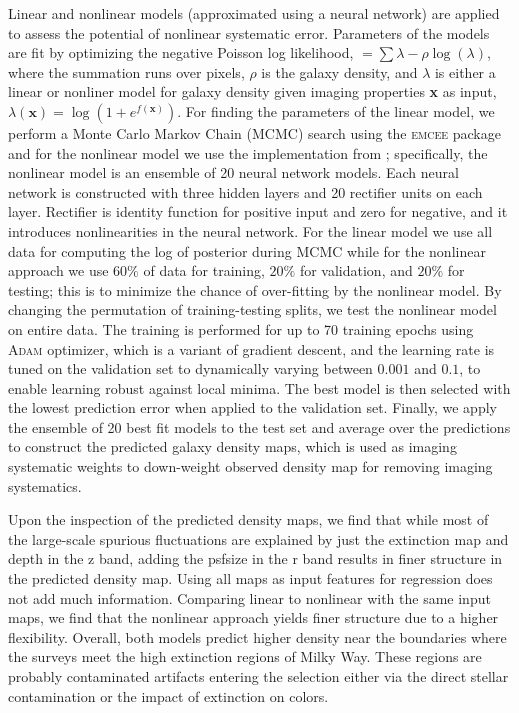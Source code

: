 Linear and nonlinear models (approximated using a neural network) are applied to assess the potential of nonlinear systematic error. Parameters of the models are fit by optimizing the negative Poisson log likelihood, $= \sum \lambda - \rho \log(\lambda)$, where the summation runs over pixels, $\rho$ is the galaxy density, and $\lambda$ is either a linear or nonliner model for galaxy density given imaging properties \textbf{x} as input, $\lambda(\textbf{x}) = \log (1+e^{f(\textbf{x})})$. For finding the parameters of the linear model, we perform a Monte Carlo Markov Chain (MCMC) search using the \textsc{emcee} package  and for the nonlinear model we use the implementation from \cite{rezaie2021primordial}; specifically, the nonlinear model is an ensemble of 20 neural network models. Each neural network is constructed with three hidden layers and 20 rectifier units on each layer. Rectifier is identity function for positive input and zero for negative, and it introduces nonlinearities in the neural network. For the linear model we use all data for computing the log of posterior during MCMC while for the nonlinear approach we use $60\%$ of data for training, $20\%$ for validation, and $20\%$ for testing; this is to minimize the chance of over-fitting by the nonlinear model. By changing the permutation of training-testing splits, we test the nonlinear model on entire data. The training is performed for up to 70 training epochs using \textsc{Adam} optimizer, which is a variant of gradient descent, and the learning rate is tuned on the validation set to dynamically varying between $0.001$ and $0.1$, to enable learning robust against local minima. The best model is then selected with the lowest prediction error when applied to the validation set. Finally, we apply the ensemble of 20 best fit models to the test set and average over the predictions to construct the predicted galaxy density maps, which is used as imaging systematic weights to down-weight observed density map for removing imaging systematics. 

Upon the inspection of the predicted density maps, we find that while most of the large-scale spurious fluctuations are explained by just the extinction map and depth in the z band, adding the psfsize in the r band results in finer structure in the predicted density map. Using all maps as input features for regression does not add much information. Comparing linear to nonlinear with the same input maps, we find that the nonlinear approach yields finer structure due to a higher flexibility.  Overall, both models predict higher density near the boundaries where the surveys meet the high extinction regions of Milky Way. These regions are probably contaminated artifacts entering the selection either via the direct stellar contamination or the impact of extinction on colors.

